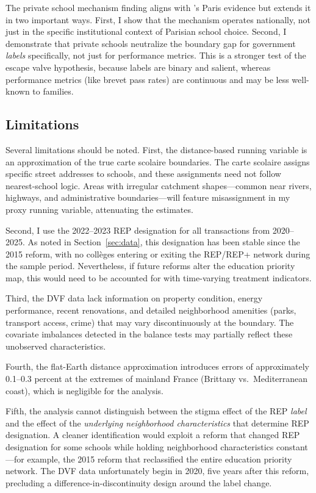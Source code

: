 \documentclass[12pt]{article}
\begin{document}
The private school mechanism finding aligns with \citet{fack2010}'s Paris evidence but extends it in two important ways. First, I show that the mechanism operates nationally, not just in the specific institutional context of Parisian school choice. Second, I demonstrate that private schools neutralize the boundary gap for government \textit{labels} specifically, not just for performance metrics. This is a stronger test of the escape valve hypothesis, because labels are binary and salient, whereas performance metrics (like brevet pass rates) are continuous and may be less well-known to families.

\subsection{Limitations}

Several limitations should be noted. First, the distance-based running variable is an approximation of the true carte scolaire boundaries. The carte scolaire assigns specific street addresses to schools, and these assignments need not follow nearest-school logic. Areas with irregular catchment shapes---common near rivers, highways, and administrative boundaries---will feature misassignment in my proxy running variable, attenuating the estimates.

Second, I use the 2022--2023 REP designation for all transactions from 2020--2025. As noted in Section~\ref{sec:data}, this designation has been stable since the 2015 reform, with no coll\`{e}ges entering or exiting the REP/REP+ network during the sample period. Nevertheless, if future reforms alter the education priority map, this would need to be accounted for with time-varying treatment indicators.

Third, the DVF data lack information on property condition, energy performance, recent renovations, and detailed neighborhood amenities (parks, transport access, crime) that may vary discontinuously at the boundary. The covariate imbalances detected in the balance tests may partially reflect these unobserved characteristics.

Fourth, the flat-Earth distance approximation introduces errors of approximately 0.1--0.3 percent at the extremes of mainland France (Brittany vs.\ Mediterranean coast), which is negligible for the analysis.

Fifth, the analysis cannot distinguish between the stigma effect of the REP \textit{label} and the effect of the \textit{underlying neighborhood characteristics} that determine REP designation. A cleaner identification would exploit a reform that changed REP designation for some schools while holding neighborhood characteristics constant---for example, the 2015 reform that reclassified the entire education priority network. The DVF data unfortunately begin in 2020, five years after this reform, precluding a difference-in-discontinuity design around the label change.
\end{document}
